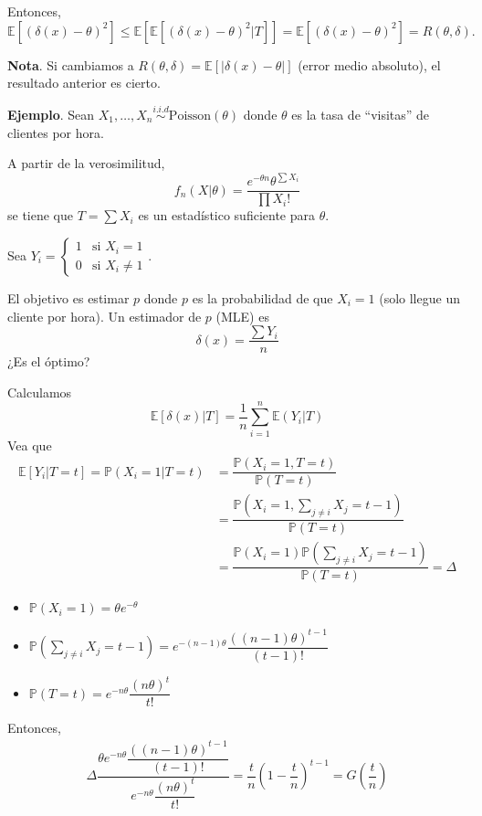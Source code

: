 \documentclass[
  12pt,
]{book}
\begin{document}
Entonces,
\[ \mathbb E[(\delta(x)-\theta)^2] \leq \mathbb E[\mathbb E[(\delta(x)-\theta)^2|T]] = \mathbb E[(\delta(x)-\theta)^2] = R(\theta,\delta).\]

\textbf{Nota}. Si cambiamos a \(R(\theta,\delta) = \mathbb E[|\delta(x)-\theta|]\) (error medio absoluto), el resultado anterior es cierto.

\textbf{Ejemplo}. Sean \(X_1,\dots, X_n \stackrel{i.i.d}{\sim} \text{Poisson}(\theta)\) donde \(\theta\) es la tasa de ``visitas'' de clientes por hora.

A partir de la verosimilitud,
\[f_n(X|\theta) = \dfrac{e^{-\theta n} \theta^{\sum X_i}}{\prod X_i!} \]
se tiene que \(T=\sum X_i\) es un estadístico suficiente para \(\theta\).

Sea \(Y_i = \begin{cases} 1 & \text{si } X_i = 1\\ 0 & \text{si } X_i \ne 1\end{cases}\).

El objetivo es estimar \(p\) donde \(p\) es la probabilidad de que \(X_i =1\) (solo llegue un cliente por hora). Un estimador de \(p\) (MLE) es
\[\delta(x) = \dfrac{\sum Y_i}{n}\]
¿Es el óptimo?

Calculamos
\[\mathbb E[\delta(x)|T] = \dfrac 1n \sum_{i=1}^n \mathbb E (Y_i|T)\]
Vea que
\begin{align*}
\mathbb E[Y_i|T = t] = \mathbb P(X_i = 1 | T = t) & = \dfrac{\mathbb P(X_i = 1, T=t)}{\mathbb P(T=t)}\\
& = \dfrac{\mathbb P(X_i = 1, \sum_{j\ne i} X_j = t-1)}{\mathbb P(T=t)}\\
& = \dfrac{\mathbb P(X_i = 1) \mathbb P(\sum_{j\ne i} X_j = t-1)}{\mathbb P(T=t)} = \Delta
\end{align*}

\begin{itemize}
\item
  \(\mathbb P(X_i = 1) = \theta e^{-\theta}\)
\item
  \(\mathbb P(\sum_{j\ne i}X_j = t-1) = e^{-(n-1)\theta}\dfrac{((n-1)\theta)^{t-1}}{(t-1)!}\)
\item
  \(\mathbb P(T=t) = e^{-n\theta}\dfrac{(n\theta)^t}{t!}\)
\end{itemize}

Entonces,
\begin{align*}
\Delta  \dfrac{\theta e^{-n\theta}\dfrac{((n-1)\theta)^{t-1}}{(t-1)!}}{e^{-n\theta}\dfrac{(n\theta)^t}{t!}} = \dfrac tn \left(1-\dfrac tn\right)^{t-1} = G\left(\dfrac tn\right)
\end{align*}
\end{document}
